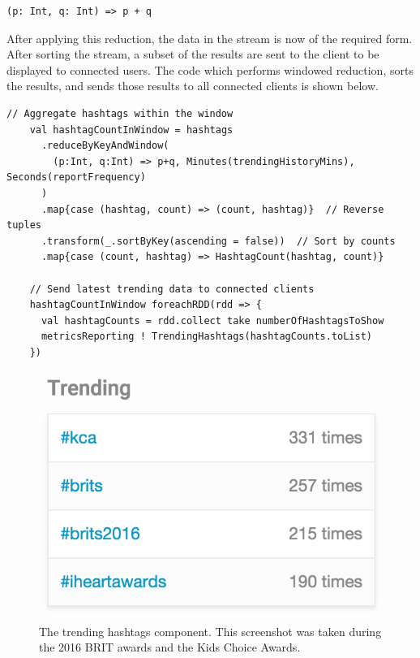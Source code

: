 \documentclass{l4proj}
\begin{document}
\begin{lstlisting}
(p: Int, q: Int) => p + q
\end{lstlisting}

After applying this reduction, the data in the stream is now of the required form. After sorting the stream, a subset of the results are sent to the client to be displayed to connected users. The code which performs windowed reduction, sorts the results, and sends those results to all connected clients is shown below.

\begin{lstlisting}[caption=Counting the hashtags used within a temporal window.]
    // Aggregate hashtags within the window
    val hashtagCountInWindow = hashtags
      .reduceByKeyAndWindow(
        (p:Int, q:Int) => p+q, Minutes(trendingHistoryMins), Seconds(reportFrequency)
      )
      .map{case (hashtag, count) => (count, hashtag)}  // Reverse tuples
      .transform(_.sortByKey(ascending = false))  // Sort by counts
      .map{case (count, hashtag) => HashtagCount(hashtag, count)}

    // Send latest trending data to connected clients
    hashtagCountInWindow foreachRDD(rdd => {
      val hashtagCounts = rdd.collect take numberOfHashtagsToShow
      metricsReporting ! TrendingHashtags(hashtagCounts.toList)
    })

\end{lstlisting}

\begin{figure}
\centering
\includegraphics[scale=0.75]{trending.png}
\caption{The trending hashtags component. This screenshot was taken during the 2016 BRIT awards and the Kids Choice Awards.}
\label{trending}
\end{figure}
                          
\end{document}
